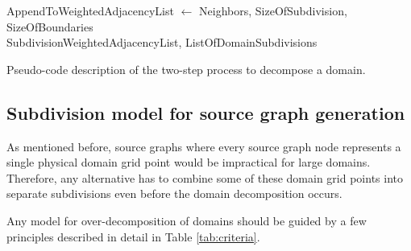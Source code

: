 \begin{algorithm}[!htbp]
{{    AppendToWeightedAdjacencyList $\leftarrow$ Neighbors, SizeOfSubdivision, SizeOfBoundaries
\\
}
\Return SubdivisionWeightedAdjacencyList, ListOfDomainSubdivisions
}
\BlankLine
{}
\BlankLine
\caption{Pseudo-code description of the two-step process to decompose a domain.}
\label{alg:domaindecomposition}
\end{algorithm}


\subsection{Subdivision model for source graph generation}
\label{sec:subdivmodel}
As mentioned before, source graphs where every source graph node represents a single physical domain grid point would be impractical for large domains.
Therefore, any alternative has to combine some of these domain grid points into separate subdivisions even before the domain decomposition occurs.

Any model for over-decomposition of domains should be guided by a few principles described in detail in Table \ref{tab:criteria}.


